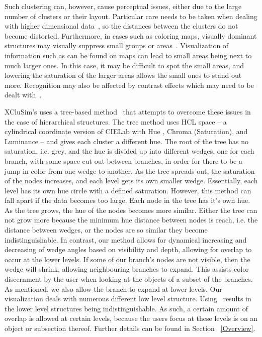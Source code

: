 \documentclass[review,journal]{vgtc}         %
\begin{document}
Such clustering can, however, cause perceptual issues, either due to the large number of clusters or their layout. 
Particular care needs to be taken when dealing with higher dimensional data~\cite{mittelstiidt2014revisiting}, so the distances between the clusters do not become distorted. 
Furthermore, in cases such as coloring maps, visually dominant structures may visually suppress small groups or areas~\cite{lee2013perceptually}.
Visualization of information such as can be found on maps can lead to small areas being next to much larger ones. 
In this case, it may be difficult to spot the small areas, and lowering the saturation of the larger areas allows the small ones to stand out more.
Recognition may also be affected by contrast effects which may need to be dealt with~\cite{mittelstadt2014methods}. 


XCluSim’s uses a tree-based method~\cite{tennekes2014tree} that attempts to overcome these issues in the case of hierarchical structures. 
The tree method uses HCL space – a cylindrical coordinate version of CIELab with Hue , Chroma (Saturation), and Luminance – and gives each cluster a different hue. 
The root of the tree has no saturation, i.e. grey, and the hue is divided up into different wedges, one for each branch, with some space cut out between branches, in order for there to be a jump in color from one wedge to another. 
As the tree spreads out, the saturation of the nodes increases, and each level gets its own smaller wedge. 
Essentially, each level has its own hue circle with a defined saturation. 
However, this method can fall apart if the data becomes too large. Each node in the tree has it's own hue. 
As the tree grows, the hue of the nodes becomes more similar. 
Either the tree can not grow more because the minimum hue distance between nodes is reach, i.e. the distance between wedges, or the nodes are so similar they become indistinguishable. 
In contrast, our method allows for dynamical increasing and decreasing of wedge angles based on visibility and depth, allowing for overlap to occur at the lower levels. 
If some of our branch's nodes are not visible, then the wedge will shrink, allowing neighbouring branches to expand. 
This assists color discernment by the user when looking at the objects of a subset of the branches.
As mentioned, we also allow the branch to expand at lower levels.
Our visualization deals with numerous different low level structure. 
Using~\cite{tennekes2014tree} results in the lower level structures being indistinguishable. 
As such, a certain amount of overlap is allowed at certain levels, because the users focus at these levels is on an object or subsection thereof. 
Further details can be found in Section ~\ref{Overview}.
\end{document}
